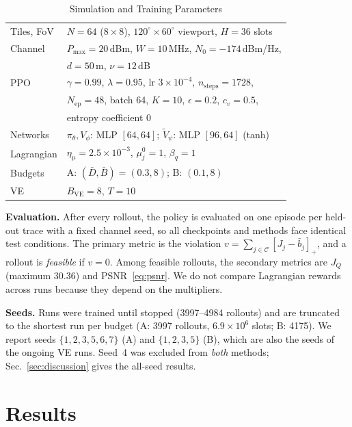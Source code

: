 \documentclass[conference]{IEEEtran}
\newcommand{\Cset}{\mathcal{C}}
\newcommand{\Vt}{\widetilde{V}}
\newcommand{\BVE}{B_{\mathrm{VE}}}
\begin{document}
\begin{table}[t]
\caption{Simulation and Training Parameters}
\label{tab:params}
\centering
\footnotesize
\setlength{\tabcolsep}{3pt}
\begin{tabular}{@{}ll@{}}
\toprule
Tiles, FoV & $N=64$ ($8\times8$), $120^\circ\times60^\circ$ viewport, $H=36$ slots\\
Channel & $P_{\max}=20$\,dBm, $W=10$\,MHz, $N_0=-174$\,dBm/Hz,\\
 & $d=50$\,m, $\nu=12$\,dB~\cite{chakareski2025mmsp}\\
PPO & $\gamma=0.99$, $\lambda=0.95$, lr $3{\times}10^{-4}$, $n_{\mathrm{steps}}=1728$,\\
 & $N_{\mathrm{ep}}=48$, batch 64, $K=10$, $\epsilon=0.2$, $c_v=0.5$,\\
 & entropy coefficient 0\\
Networks & $\pi_\theta,V_\phi$: MLP $[64,64]$; $\Vt_\psi$: MLP $[96,64]$ (tanh)\\
Lagrangian & $\eta_\mu=2.5{\times}10^{-3}$, $\mu_j^0=1$, $\beta_q=1$\\
Budgets & A: $(\bar D,\bar B)=(0.3,8)$; B: $(0.1,8)$\\
VE & $\BVE=8$, $T=10$\\
\bottomrule
\end{tabular}
\end{table}

\textbf{Evaluation.} After every rollout, the policy is evaluated on one episode per held-out trace with a fixed channel seed, so all checkpoints and methods face identical test conditions. The primary metric is the violation $v=\sum_{j\in\Cset}[J_j-\bar b_j]_+$, and a rollout is \emph{feasible} if $v=0$. Among feasible rollouts, the secondary metrics are $J_Q$ (maximum 30.36) and PSNR~\eqref{eq:psnr}. We do not compare Lagrangian rewards across runs because they depend on the multipliers.

\textbf{Seeds.} Runs were trained until stopped (3997--4984 rollouts) and are truncated to the shortest run per budget (A: 3997 rollouts, $6.9{\times}10^6$ slots; B: 4175). We report seeds $\{1,2,3,5,6,7\}$ (A) and $\{1,2,3,5\}$ (B), which are also the seeds of the ongoing VE runs. Seed~4 was excluded from \emph{both} methods; Sec.~\ref{sec:discussion} gives the all-seed results.

\section{Results}
\label{sec:results}
\end{document}
